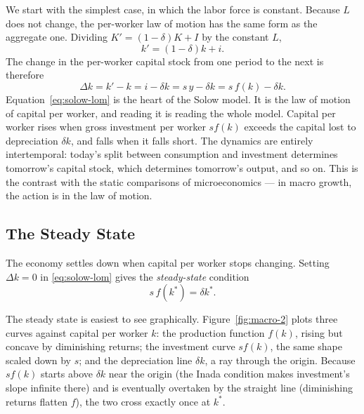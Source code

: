 We start with the simplest case, in which the labor force is constant. Because $L$ does not change, the per-worker law of motion has the same form as the aggregate one. Dividing $K' = (1-\delta)K + I$ by the constant $L$,
\[
k' = (1-\delta) k + i.
\]
The change in the per-worker capital stock from one period to the next is therefore
\begin{equation}
\Delta k = k' - k = i - \delta k = s\, y - \delta k = s\, f(k) - \delta k.
\label{eq:solow-lom}
\end{equation}
Equation~\eqref{eq:solow-lom} is the heart of the Solow model. It is the law of motion of capital per worker, and reading it is reading the whole model. Capital per worker rises when gross investment per worker $s f(k)$ exceeds the capital lost to depreciation $\delta k$, and falls when it falls short. The dynamics are entirely intertemporal: today's split between consumption and investment determines tomorrow's capital stock, which determines tomorrow's output, and so on. This is the contrast with the static comparisons of microeconomics --- in macro growth, the action is in the law of motion.

\subsection{The Steady State}

The economy settles down when capital per worker stops changing. Setting $\Delta k = 0$ in \eqref{eq:solow-lom} gives the \emph{steady-state} condition
\begin{equation}
s\, f(k^*) = \delta k^*.
\label{eq:solow-ss}
\end{equation}


The steady state is easiest to see graphically. Figure~\ref{fig:macro-2} plots three curves against capital per worker $k$: the production function $f(k)$, rising but concave by diminishing returns; the investment curve $s f(k)$, the same shape scaled down by $s$; and the depreciation line $\delta k$, a ray through the origin. Because $s f(k)$ starts above $\delta k$ near the origin (the Inada condition makes investment's slope infinite there) and is eventually overtaken by the straight line (diminishing returns flatten $f$), the two cross exactly once at $k^*$.


